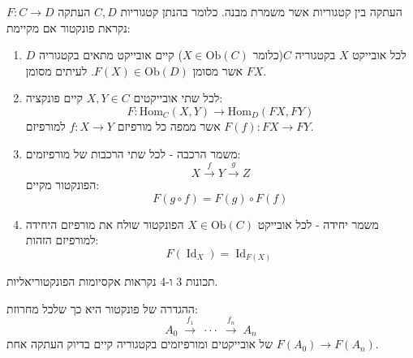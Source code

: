 \documentclass{tstextbook}
\begin{document}
\begin{definition}[פונקטור]
העתקה בין קטגוריות אשר משמרת מבנה. כלומר בהנתן קטגוריות \(C,D\) העתקה \(F:C\to D\) נקראת פונקטור אם מקיימת:

  \begin{enumerate}
    \item לכל אובייקט \(X\) בקטגוריה \(C\)(כלומר \(X \in \mathrm{Ob}(C)\)) קיים אובייקט מתאים בקטגוריה \(D\) אשר מסומן \(F(X)\in \mathrm{Ob}(D)\). לעיתים מסומן \(FX\). 


    \item לכל שתי אובייקטים \(X,Y \in C\) קיים פונקציה: 
$$F:{\mathrm{Hom}}_{C}(X,Y)\to{\mathrm{Hom}}_{D}(F X,F Y)$$
אשר ממפה כל מורפיזם \(f:X\to Y\) למורפיזם \(F(f):FX\to FY\).


    \item משמר הרכבה - לכל שתי הרכבות של מורפיזמים: 
$$X\xrightarrow{f}Y\xrightarrow{g}Z$$
הפונקטור מקיים:
$$F(g\circ  f)=F(g)\circ F(f)$$


    \item משמר יחידה - לכל אובייקט \(X \in \mathrm{Ob}(C)\) הפונקטור שולח את מורפיזם היחידה למורפיזם הזהות: 
$$F(\operatorname{Id}_{X})=\operatorname{Id}_{F(X)}$$


  \end{enumerate}
\end{definition}
\begin{remark}
תכונות 3 ו-4 נקראות אקסיומות הפונקטוריאליות.

\end{remark}
\begin{remark}
ההגדרה של פונקטור היא כך שלכל מחרוזת:
$$A_{0}\;{\xrightarrow{\ f_{1}\ }}\;\cdot\cdot\cdot\;{\xrightarrow{\ f_{n}\ }}\;A_{n}$$
של אובייקטים ומורפיזמים בקטגוריה קיים בדיוק העתקה אחת \(F(A_{0})\to F(A_{n})\).

\end{remark}
\end{document}
